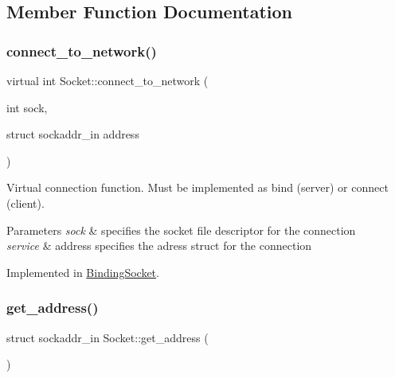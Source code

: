 \subsection{Member Function Documentation}
\mbox{\label{classSocket_a2483ca0900b0d55cfeb4b6cf5724c1e7}} 
\subsubsection{\texorpdfstring{connect\+\_\+to\+\_\+network()}{connect\_to\_network()}}
{\footnotesize\ttfamily virtual int Socket\+::connect\+\_\+to\+\_\+network (\begin{DoxyParamCaption}\item[{int}]{sock,  }\item[{struct sockaddr\+\_\+in}]{address }\end{DoxyParamCaption})\hspace{0.3cm}{\ttfamily [pure virtual]}}



Virtual connection function. Must be implemented as bind (server) or connect (client). 


\begin{DoxyParams}{Parameters}
{\em sock} & specifies the socket file descriptor for the connection \\
\hline
{\em service} & address specifies the adress struct for the connection \\
\hline
\end{DoxyParams}


Implemented in \hyperlink{classBindingSocket_a02a8a46a6a5d5c3205d53f2a9840455a}{Binding\+Socket}.

\mbox{\label{classSocket_a6a36bc269e33e3ffda2c224a9b8bf961}} 
\subsubsection{\texorpdfstring{get\+\_\+address()}{get\_address()}}
{\footnotesize\ttfamily struct sockaddr\+\_\+in Socket\+::get\+\_\+address (\begin{DoxyParamCaption}{ }\end{DoxyParamCaption})}



